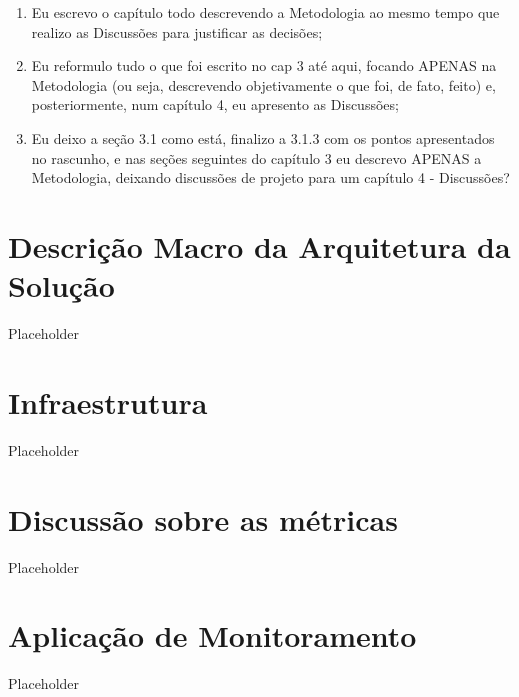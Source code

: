 {{    \begin{enumerate}
        \item Eu escrevo o capítulo todo descrevendo a Metodologia ao mesmo tempo que realizo as Discussões para justificar as decisões;
        \item Eu reformulo tudo o que foi escrito no cap 3 até aqui, focando APENAS na Metodologia (ou seja, descrevendo objetivamente o que foi, de fato, feito) e, posteriormente, num capítulo 4, eu apresento as Discussões;
        \item Eu deixo a seção 3.1 como está, finalizo a 3.1.3 com os pontos apresentados no rascunho, e nas seções seguintes do capítulo 3 eu descrevo APENAS a Metodologia, deixando discussões de projeto para um capítulo 4 - Discussões?



    \end{enumerate}

     
     
     
     
     


}
}
\section{Descrição Macro da Arquitetura da Solução}

Placeholder

\section{Infraestrutura}

Placeholder

\section{Discussão sobre as métricas}

Placeholder

\section{Aplicação de Monitoramento}

Placeholder
